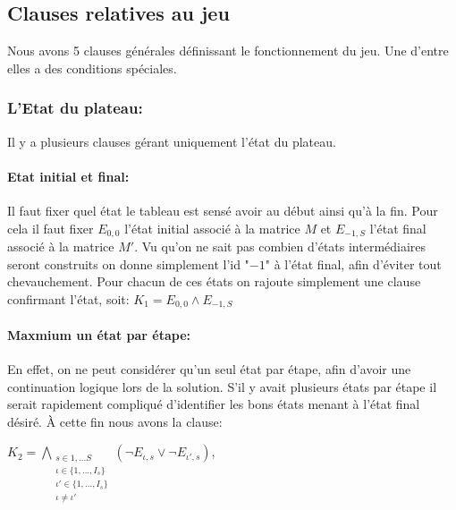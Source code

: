 \documentclass[utf8]{article}
\begin{document}
\subsection{Clauses relatives au jeu}
Nous avons 5 clauses générales définissant le fonctionnement du jeu. Une d'entre elles a des conditions  spéciales.

\subsubsection{L'Etat du plateau:}
Il y a plusieurs clauses gérant uniquement l'état du plateau. \newline
\paragraph{Etat initial et final: } Il faut fixer quel état le tableau est sensé avoir au début ainsi qu'à la fin. Pour cela il faut fixer $E_{0,0}$ l'état initial associé à la matrice $M$ et $E_{-1,S}$ l'état final associé à la matrice $M'$.
Vu qu'on ne sait pas combien d'états intermédiaires seront construits on donne simplement l'id "$-1$" à l'état final, afin d'éviter tout chevauchement. \newline
Pour chacun de ces états on rajoute simplement une clause confirmant l'état, soit: \newline
$K_1 = E_{0,0} \wedge E_{-1,S}$
\newline

\paragraph{Maxmium un état par étape:}
En effet, on ne peut considérer qu'un seul état par étape, afin d'avoir une continuation logique lors de la solution. S'il y avait plusieurs états par étape il serait rapidement compliqué d'identifier les bons états menant à l'état final désiré. À cette fin nous avons la clause: \newline


$K_2 = {\underset{\substack{s\in{1,...S}\\\iota\in\{1,...,I_s\}\\\iota'\in\{1,...,I_s\}\\\iota \neq \iota'}}{\bigwedge}}(\neg E_{\iota,s} \vee \neg E_{\iota',s})$,
\newline
\end{document}

